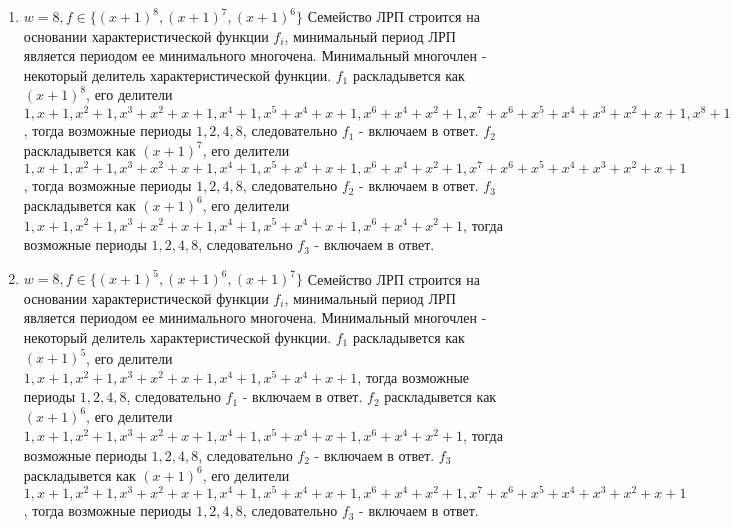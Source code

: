 \documentclass[12pt]{extarticle}
\begin{document}
\begin{enumerate}
    \item $w=8, f\in \{(x+1)^8, (x+1)^7, (x+1)^6\}$
    Семейство ЛРП строится на основании характеристической функции $f_i$, минимальный период ЛРП является периодом ее минимального многочена. Минимальный многочлен - некоторый делитель характеристической функции. $f_1$ раскладывется как $(x+1)^8$, его делители $1, x+1, x^2+1, x^3+x^2+x+1, x^4+1, x^5+x^4+x+1, x^6+x^4+x^2+1, x^7+x^6+x^5+x^4+x^3+x^2+x+1, x^8+1$, тогда возможные периоды $1, 2, 4, 8$, следовательно $f_1$ - включаем в ответ. $f_2$ раскладывется как $(x+1)^7$, его делители $1, x+1, x^2+1, x^3+x^2+x+1, x^4+1, x^5+x^4+x+1, x^6+x^4+x^2+1, x^7+x^6+x^5+x^4+x^3+x^2+x+1$, тогда возможные периоды $1, 2, 4, 8$, следовательно $f_2$ - включаем в ответ. $f_3$ раскладывется как $(x+1)^6$, его делители $1, x+1, x^2+1, x^3+x^2+x+1, x^4+1, x^5+x^4+x+1, x^6+x^4+x^2+1$, тогда возможные периоды $1, 2, 4, 8$, следовательно $f_3$ - включаем в ответ.
    
    \item $w=8, f\in \{(x+1)^5, (x+1)^6, (x+1)^7\}$
    Семейство ЛРП строится на основании характеристической функции $f_i$, минимальный период ЛРП является периодом ее минимального многочена. Минимальный многочлен - некоторый делитель характеристической функции. $f_1$ раскладывется как $(x+1)^5$, его делители $1, x+1, x^2+1, x^3+x^2+x+1, x^4+1, x^5+x^4+x+1$, тогда возможные периоды $1, 2, 4, 8$, следовательно $f_1$ - включаем в ответ. $f_2$ раскладывется как $(x+1)^6$, его делители $1, x+1, x^2+1, x^3+x^2+x+1, x^4+1, x^5+x^4+x+1, x^6+x^4+x^2+1$, тогда возможные периоды $1, 2, 4, 8$, следовательно $f_2$ - включаем в ответ. $f_3$ раскладывется как $(x+1)^6$, его делители $1, x+1, x^2+1, x^3+x^2+x+1, x^4+1, x^5+x^4+x+1, x^6+x^4+x^2+1, x^7+x^6+x^5+x^4+x^3+x^2+x+1$, тогда возможные периоды $1, 2, 4, 8$, следовательно $f_3$ - включаем в ответ.
\end{enumerate}
\end{document}
